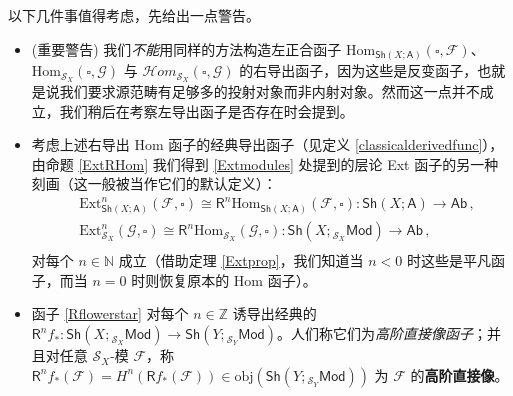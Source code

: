 \begin{Rem}\label{sectfuncispushforward}
以下几件事值得考虑，先给出一点警告。
\begin{itemize}[leftmargin=0.5cm]
	\item (重要警告) 我们\textit{不能}用同样的方法构造左正合函子 $\text{Hom}_{\mathsf{Sh}(X;\mathsf{A})}(\square,\mathcal{F})$、$\text{Hom}_{\mathcal{S}_X}(\square,\mathcal{G})$ 与 $\mathcal{H}om_{\mathcal{S}_X}\!(\square,\mathcal{G})$ 的右导出函子，因为这些是反变函子，也就是说我们要求源范畴有足够多的投射对象而非内射对象。然而这一点并不成立，我们稍后在考察左导出函子是否存在时会提到。
	
	\item 考虑上述右导出 Hom 函子的经典导出函子（见定义 \ref{classicalderivedfunc}），由命题 \ref{ExtRHom} 我们得到 \eqref{Extmodules} 处提到的层论 Ext 函子的另一种刻画（这一般被当作它们的默认定义）：
	\begin{equation}\label{ExtRHomformodules}
		\begin{aligned}
			&\text{Ext}_{\mathsf{Sh}(X;\mathsf{A})}^n(\mathcal{F},\square)\cong\mathsf{R}^n\text{Hom}_{\mathsf{Sh}(X;\mathsf{A})}(\mathcal{F},\square):\mathsf{Sh}(X;\mathsf{A})\rightarrow\mathsf{Ab}\,, \\ 
			&\text{Ext}_{\mathcal{S}_X}^n(\mathcal{G},\square)\cong\mathsf{R}^n\text{Hom}_{\mathcal{S}_X}(\mathcal{G},\square):\mathsf{Sh}(X;{}_{\mathcal{S}_X}\!\mathsf{Mod})\rightarrow\mathsf{Ab}\,, \\ 
		\end{aligned}  
	\end{equation}
	对每个 $n\in\mathbb{N}$ 成立（借助定理 \ref{Extprop}，我们知道当 $n<0$ 时这些是平凡函子，而当 $n=0$ 时则恢复原本的 Hom 函子）。
	
	\item 函子 \eqref{Rflowerstar} 对每个 $n\in\mathbb{Z}$ 诱导出经典的 $\mathsf{R}^nf_*:\mathsf{Sh}(X;{}_{\mathcal{S}_X}\!\mathsf{Mod})\rightarrow\mathsf{Sh}(Y;{}_{\mathcal{S}_Y}\!\mathsf{Mod})$。人们称它们为\textit{高阶直接像函子}；并且对任意 $\mathcal{S}_X$-模 $\mathcal{F}$，称 $\mathsf{R}^nf_*(\mathcal{F})=H^n(\mathsf{R}f_*(\mathcal{F}))\in\text{obj}(\mathsf{Sh}(Y;{}_{\mathcal{S}_Y}\!\mathsf{Mod}))$ 为 $\mathcal{F}$ 的\textbf{高阶直接像}。
	

\end{itemize}
\end{Rem}
